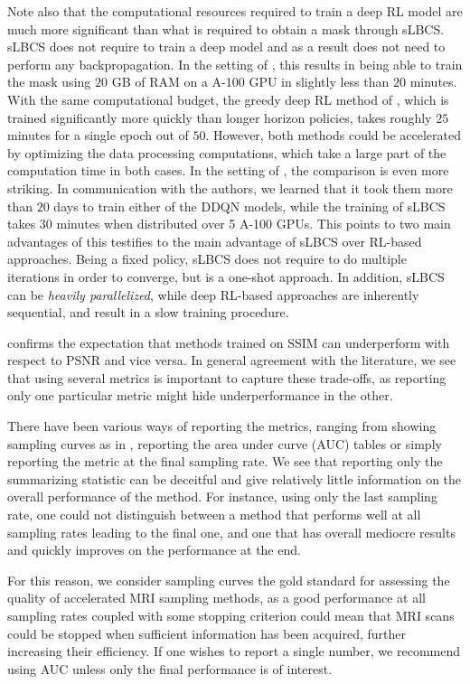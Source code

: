 Note also that the computational resources required to train a deep RL model are much more significant than what is required to obtain a mask through sLBCS. sLBCS does not require to train a deep model and as a result does not need to perform any backpropagation. In the setting of \citet{bakker2020experimental}, this results in being able to train the mask using $20$ GB of RAM on a A-100 GPU in slightly less than $20$ minutes. With the same computational budget, the greedy deep RL method of \citep{bakker2020experimental}, which is trained significantly more quickly than longer horizon policies, takes roughly $25$ minutes for a single epoch out of $50$. However, both methods could be accelerated by optimizing the data processing computations, which take a large part of the computation time in both cases. In the setting of \citet{pineda2020active}, the comparison is even more striking. In communication with the authors, we learned that it took them more than $20$ days to train either of the DDQN models, while the training of sLBCS takes 30 minutes when distributed over 5 A-100 GPUs. This points to two main advantages of this testifies to the main advantage of sLBCS over RL-based approaches. Being a fixed policy, sLBCS does not require to do multiple iterations in order to converge, but is a one-shot approach. In addition, sLBCS can be \textit{heavily parallelized}, while deep RL-based approaches are inherently sequential, and result in a slow training procedure.

 confirms the expectation that methods trained on SSIM can underperform with respect to PSNR and vice versa. In general agreement with the literature, we see that using several metrics is important to capture these trade-offs, as reporting only one particular metric might hide underperformance in the other.

There have been various ways of reporting the metrics, ranging from showing sampling curves as in , reporting the area under curve (AUC) tables or simply reporting the metric at the final sampling rate.
We see that reporting only the summarizing statistic can be deceitful and give relatively little information on the overall performance of the method.
For instance, using only the last sampling rate, one could not distinguish between a method that performs well at all sampling rates leading to the final one, and one that has overall mediocre results and quickly improves on the performance at the end.

For this reason, we consider sampling curves the gold standard for assessing the quality of accelerated MRI sampling methods, as a good performance at all sampling rates coupled with some stopping criterion could mean that MRI scans could be stopped when sufficient information has been acquired, further increasing their efficiency.
If one wishes to report a single number, we recommend using AUC unless only the final performance is of interest.

